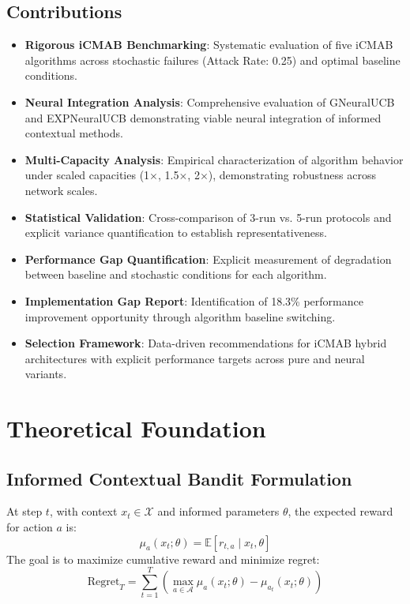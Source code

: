 \documentclass[12pt,a4paper]{article}
\begin{document}
\subsection{Contributions}
\begin{itemize}
\item \textbf{Rigorous iCMAB Benchmarking}: Systematic evaluation of five iCMAB algorithms across stochastic failures (Attack Rate: 0.25) and optimal baseline conditions.
\item \textbf{Neural Integration Analysis}: Comprehensive evaluation of GNeuralUCB and EXPNeuralUCB demonstrating viable neural integration of informed contextual methods.
\item \textbf{Multi-Capacity Analysis}: Empirical characterization of algorithm behavior under scaled capacities (1$\times$, 1.5$\times$, 2$\times$), demonstrating robustness across network scales.
\item \textbf{Statistical Validation}: Cross-comparison of 3-run vs. 5-run protocols and explicit variance quantification to establish representativeness.
\item \textbf{Performance Gap Quantification}: Explicit measurement of degradation between baseline and stochastic conditions for each algorithm.
\item \textbf{Implementation Gap Report}: Identification of 18.3\% performance improvement opportunity through algorithm baseline switching.
\item \textbf{Selection Framework}: Data-driven recommendations for iCMAB hybrid architectures with explicit performance targets across pure and neural variants.
\end{itemize}

\section{Theoretical Foundation}

\subsection{Informed Contextual Bandit Formulation}
At step $t$, with context $x_t \in \mathcal{X}$ and informed parameters $\theta$, the expected reward for action $a$ is:
\[
\mu_a(x_t; \theta) = \mathbb{E}[r_{t,a} \mid x_t, \theta]
\]
The goal is to maximize cumulative reward and minimize regret:
\[
\mathrm{Regret}_T = \sum_{t=1}^{T}\left(\max_{a \in \mathcal{A}} \mu_a(x_t;\theta) - \mu_{a_t}(x_t;\theta)\right)
\]
\end{document}
